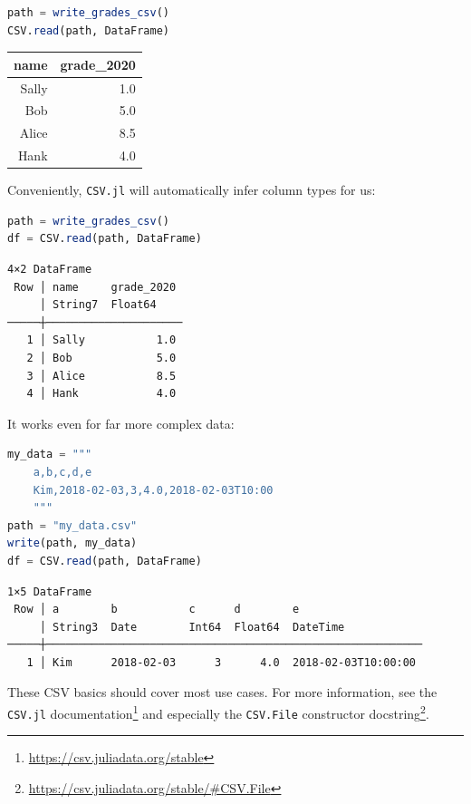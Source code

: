 \documentclass[
  notoc %
]{tufte-book}
\DeclareRobustCommand{\href}[2]{#2\footnote{\url{#1}}}
\newcommand{\passthrough}[1]{#1}
\begin{document}
\begin{lstlisting}[language=Julia]
path = write_grades_csv()
CSV.read(path, DataFrame)
\end{lstlisting}

\begin{longtable}[]{@{}rr@{}}
\toprule
name & grade\_2020 \\
\midrule
\endhead
Sally & 1.0 \\
Bob & 5.0 \\
Alice & 8.5 \\
Hank & 4.0 \\
\bottomrule
\end{longtable}

Conveniently, \passthrough{\lstinline!CSV.jl!} will automatically infer
column types for us:

\begin{lstlisting}[language=Julia]
path = write_grades_csv()
df = CSV.read(path, DataFrame)
\end{lstlisting}

\begin{lstlisting}[language=Output]
4×2 DataFrame
 Row │ name     grade_2020
     │ String7  Float64
─────┼─────────────────────
   1 │ Sally           1.0
   2 │ Bob             5.0
   3 │ Alice           8.5
   4 │ Hank            4.0
\end{lstlisting}

It works even for far more complex data:

\begin{lstlisting}[language=Julia]
my_data = """
    a,b,c,d,e
    Kim,2018-02-03,3,4.0,2018-02-03T10:00
    """
path = "my_data.csv"
write(path, my_data)
df = CSV.read(path, DataFrame)
\end{lstlisting}

\begin{lstlisting}[language=Output]
1×5 DataFrame
 Row │ a        b           c      d        e
     │ String3  Date        Int64  Float64  DateTime
─────┼──────────────────────────────────────────────────────────
   1 │ Kim      2018-02-03      3      4.0  2018-02-03T10:00:00
\end{lstlisting}

These CSV basics should cover most use cases. For more information, see
the
\href{https://csv.juliadata.org/stable}{\passthrough{\lstinline!CSV.jl!}
documentation} and especially the
\href{https://csv.juliadata.org/stable/\#CSV.File}{\passthrough{\lstinline!CSV.File!}
constructor docstring}.
\end{document}
